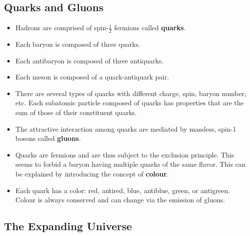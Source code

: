 \documentclass{article}
\begin{document}
\subsection{Quarks and Gluons}

\begin{itemize}
  \item Hadrons are comprised of spin-$\frac{1}{2}$ fermions called \textbf{quarks}.

  \item Each baryon is composed of three quarks.

  \item Each antibaryon is composed of three antiquarks.

  \item Each meson is composed of a quark-antiquark pair.

  \item There are several types of quarks with different charge, spin, baryon number, etc. Each subatomic particle composed of quarks has properties that are the sum of those of their constituent quarks.

  \item The attractive interaction among quarks are mediated by massless, spin-1 bosons called \textbf{gluons}.

  \item Quarks are fermions and are thus subject to the exclusion principle. This seems to forbid a baryon having multiple quarks of the same flavor. This can be explained by introducing the concept of \textbf{colour}.

  \item Each quark has a color: red, antired, blue, antiblue, green, or antigreen. Colour is always conserved and can change via the emission of gluons.
\end{itemize}

\setcounter{subsection}{5}
\subsection{The Expanding Universe}
\end{document}
